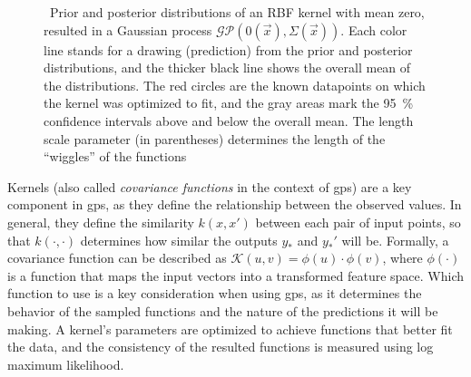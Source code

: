 \begin{figure}[t]
	\centering
	\hfill %
	\caption[Prior and posterior of RBF kernel]
		{\hspace{-0.18cm}\footnotemark\ 
		Prior and posterior distributions of an RBF kernel with mean zero, resulted in a Gaussian process $\mathcal{GP}\left( 0 (\vec{x}), \Sigma(\vec{x}) \right)$.
		Each color line stands for a drawing (prediction) from the prior and posterior distributions, and the thicker black line shows the overall mean of the distributions.
		The red circles are the known datapoints on which the kernel was optimized to fit, and the gray areas mark the \SI{95}{\percent} confidence intervals above and below the overall mean.
		The length scale parameter (in parentheses) determines the length of the \enquote{wiggles} of the functions}
	\label{fig:RBF_prior_posterior}
\end{figure}


Kernels (also called \textit{covariance functions} in the context of \acp{gp}) are a key component in \acp{gp}, as they define the relationship between the observed values.
In general, they define the similarity $k(x, x')$ between each pair of input points, so that $k(\cdot, \cdot)$ determines how similar the outputs $y_*$ and $y_*'$ will be. 
Formally, a covariance function can be described as $\mathcal{K}(u, v) = \phi(u) \cdot \phi(v)$, where $\phi(\cdot)$ is a function that maps the input vectors into a transformed feature space.
Which function to use is a key consideration when using \acp{gp}, as it determines the behavior of the sampled functions and the nature of the predictions it will be making.
A kernel's parameters are optimized to achieve functions that better fit the data, and the consistency of the resulted functions is measured using log maximum likelihood.

